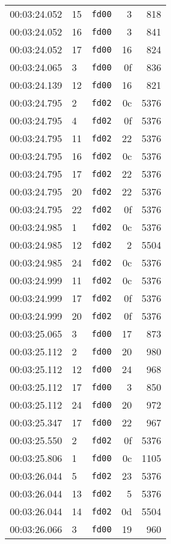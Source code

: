 \documentclass{article}
\begin{document}
\begin{longtable}{lllrr}
00:03:24.052 & 15 & \texttt{fd00} & 3 & 818 \\
00:03:24.052 & 16 & \texttt{fd00} & 3 & 841 \\
00:03:24.052 & 17 & \texttt{fd00} & 16 & 824 \\
00:03:24.065 & 3 & \texttt{fd00} & 0f & 836 \\
00:03:24.139 & 12 & \texttt{fd00} & 16 & 821 \\
00:03:24.795 & 2 & \texttt{fd02} & 0c & 5376 \\
00:03:24.795 & 4 & \texttt{fd02} & 0f & 5376 \\
00:03:24.795 & 11 & \texttt{fd02} & 22 & 5376 \\
00:03:24.795 & 16 & \texttt{fd02} & 0c & 5376 \\
00:03:24.795 & 17 & \texttt{fd02} & 22 & 5376 \\
00:03:24.795 & 20 & \texttt{fd02} & 22 & 5376 \\
00:03:24.795 & 22 & \texttt{fd02} & 0f & 5376 \\
00:03:24.985 & 1 & \texttt{fd02} & 0c & 5376 \\
00:03:24.985 & 12 & \texttt{fd02} & 2 & 5504 \\
00:03:24.985 & 24 & \texttt{fd02} & 0c & 5376 \\
00:03:24.999 & 11 & \texttt{fd02} & 0c & 5376 \\
00:03:24.999 & 17 & \texttt{fd02} & 0f & 5376 \\
00:03:24.999 & 20 & \texttt{fd02} & 0f & 5376 \\
00:03:25.065 & 3 & \texttt{fd00} & 17 & 873 \\
00:03:25.112 & 2 & \texttt{fd00} & 20 & 980 \\
00:03:25.112 & 12 & \texttt{fd00} & 24 & 968 \\
00:03:25.112 & 17 & \texttt{fd00} & 3 & 850 \\
00:03:25.112 & 24 & \texttt{fd00} & 20 & 972 \\
00:03:25.347 & 17 & \texttt{fd00} & 22 & 967 \\
00:03:25.550 & 2 & \texttt{fd02} & 0f & 5376 \\
00:03:25.806 & 1 & \texttt{fd00} & 0c & 1105 \\
00:03:26.044 & 5 & \texttt{fd02} & 23 & 5376 \\
00:03:26.044 & 13 & \texttt{fd02} & 5 & 5376 \\
00:03:26.044 & 14 & \texttt{fd02} & 0d & 5504 \\
00:03:26.066 & 3 & \texttt{fd00} & 19 & 960 \\

\end{longtable}
\end{document}
